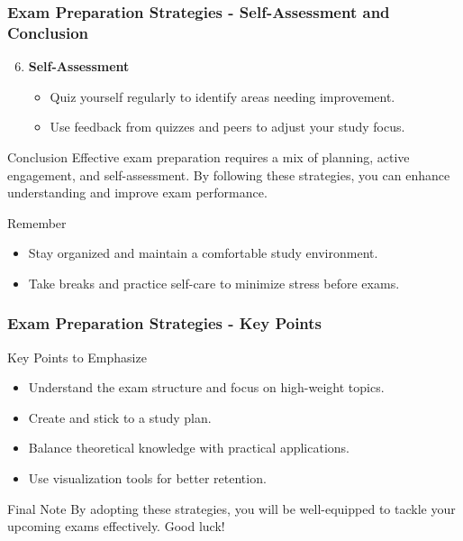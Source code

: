 \documentclass[aspectratio=169]{beamer}
\begin{document}
\begin{frame}[fragile]
    \frametitle{Exam Preparation Strategies - Self-Assessment and Conclusion}
    \begin{enumerate}
        \setcounter{enumi}{5}
        \item \textbf{Self-Assessment}
        \begin{itemize}
            \item Quiz yourself regularly to identify areas needing improvement.
            \item Use feedback from quizzes and peers to adjust your study focus.
        \end{itemize}
    \end{enumerate}

    \begin{block}{Conclusion}
        Effective exam preparation requires a mix of planning, active engagement, and self-assessment. By following these strategies, you can enhance understanding and improve exam performance.
    \end{block}

    \begin{block}{Remember}
        \begin{itemize}
            \item Stay organized and maintain a comfortable study environment.
            \item Take breaks and practice self-care to minimize stress before exams.
        \end{itemize}
    \end{block}
\end{frame}

\begin{frame}[fragile]
    \frametitle{Exam Preparation Strategies - Key Points}
    \begin{block}{Key Points to Emphasize}
        \begin{itemize}
            \item Understand the exam structure and focus on high-weight topics.
            \item Create and stick to a study plan.
            \item Balance theoretical knowledge with practical applications.
            \item Use visualization tools for better retention.
        \end{itemize}
    \end{block}
    
    \begin{block}{Final Note}
        By adopting these strategies, you will be well-equipped to tackle your upcoming exams effectively. Good luck!
    \end{block}
\end{frame}
\end{document}
